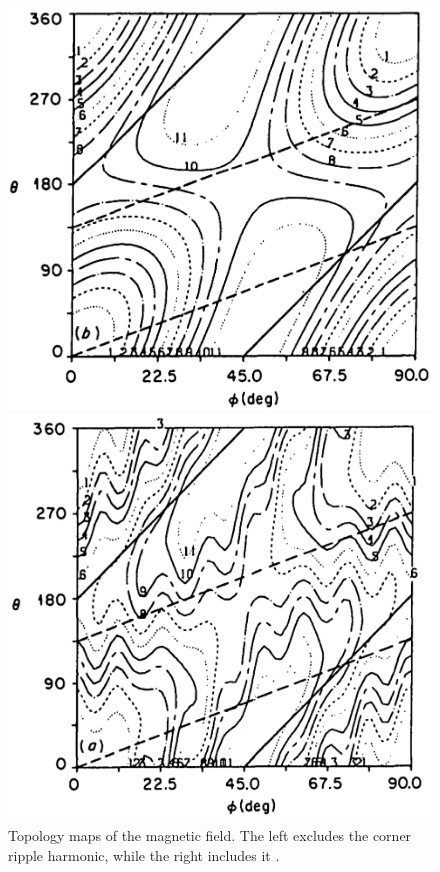 \documentclass[a4paper]{article}
\begin{document}
\begin{figure}[!b]
	\begin{minipage}{0.48\textwidth}
	\centering
	\includegraphics[width=\linewidth]{../Graphics/Bcontours.png}
\end{minipage}
\hfill\vrule\hfill
\begin{minipage}{0.48\textwidth}
	\centering
	\includegraphics[width=\linewidth]{../Graphics/Bcontours_exact.png}
\end{minipage}
	\caption{Topology maps of the magnetic field. The left excludes the corner ripple harmonic, while the right includes it \cite{solano_study_1988}.}
	\label{fig:topology}
\end{figure}
\end{document}

